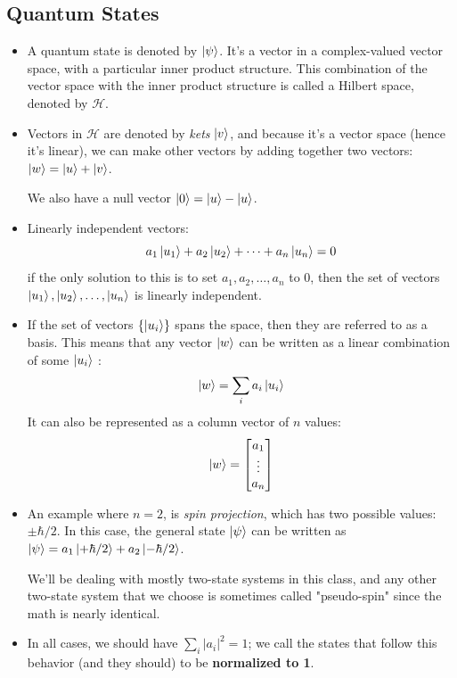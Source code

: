 \subsection{Quantum States}
\begin{itemize}
	\item A quantum state is denoted by \( \ket{\psi} \). It's a vector in a complex-valued vector space, with a
		particular inner product structure. This combination of the vector space with the inner product structure 
		is called a Hilbert space, denoted by \( \mathcal H \). 
	\item Vectors in \( \mathcal H \) are denoted by \textit{kets} \( \ket{v} \), and because it's a vector space 
		(hence it's linear), we can make other vectors by adding together two vectors: \( \ket{w} = \ket{u} + 
		\ket{v}\). 

		We also have a null vector \( \ket{0} = \ket{u} - \ket{u} \). 
	\item Linearly independent vectors: 
		\[
		a_1\ket{u_1} + a_2\ket{u_2} + \cdots + a_n\ket{u_n} = 0
		\] 
		if the only solution to this is to set \( a_1, a_2, \dots, a_n \) to 0, then the set of vectors 
		\( \ket{u_1}, \ket{u_2}, \dots, \ket{u_n} \) is linearly independent. 
		
	\item If the set of vectors \( \{\ket{u_i}\}  \) spans the space, then they are referred to as a basis. This 
		means that any vector \( \ket{w} \) can be written as a linear combination of some \( \ket{u_i} \) :
		\[
			\ket{w} = \sum_i a_i \ket{u_i} 
		\]
		It can also be represented as a column vector of \( n \) values:
		 \[
		\ket{w} = \begin{bmatrix} a_1 \\ \vdots \\ a_n \end{bmatrix} 
		\] 
	\item An example where \( n = 2 \), is \textit{spin projection}, which has two possible values: \( \pm 
		\hbar / 2\). In this case, the general state \( \ket{\psi}  \) can be written as 
		\( \ket{\psi} = a_1\ket{+\hbar / 2} + a_2\ket{-\hbar / 2} \). 
		
		We'll be dealing with mostly two-state systems in this class, and any other two-state system that we choose 
		is sometimes called "pseudo-spin" since the math is nearly identical. 
	\item In all cases, we should have \( \sum_i |a_i|^2 = 1 \); we call the states that follow this behavior 
		(and they should) to be \textbf{normalized to 1}. 
\end{itemize}
